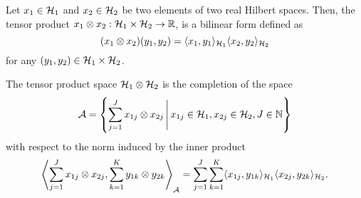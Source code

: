 \begin{definition}
  Let $x_1\in{\mathcal H}_1$ and $x_2\in{\mathcal H}_2$ be two elements of two real Hilbert spaces.
  Then, the tensor product $x_1 \otimes x_2:{\mathcal H}_1\times{\mathcal H}_2\to\mathbb{R}$, is a bilinear form defined as
  \[
    (x_1\otimes x_2)(y_1,y_2) = \langle x_1,y_1\rangle_{{\mathcal H}_1}\langle x_2,y_2\rangle_{{\mathcal H}_2}
  \]
  for any $(y_1,y_2)\in{\mathcal H}_1\times{\mathcal H}_2$.
\end{definition}

\begin{definition}
  The tensor product space ${\mathcal H}_1\otimes{\mathcal H}_2$ is the completion of the space
  \[
    {\mathcal A} = \left\{ \sum_{j=1}^J x_{1j} \otimes x_{2j} \,\Bigg\vert\, x_{1j}\in{\mathcal H}_1, x_{2j}\in{\mathcal H}_2, J \in \mathbb{N} \right\}
  \]
  with respect to the norm induced by the inner product
  \[
    \left\langle  \sum_{j=1}^J x_{1j} \otimes x_{2j},  \sum_{k=1}^K y_{1k} \otimes y_{2k} \right\rangle_{\mathcal A} = \sum_{j=1}^J\sum_{k=1}^K \langle x_{1j},y_{1k}\rangle_{{\mathcal H}_1} \langle x_{2j},y_{2k}\rangle_{{\mathcal H}_2}.
  \]
\end{definition}

